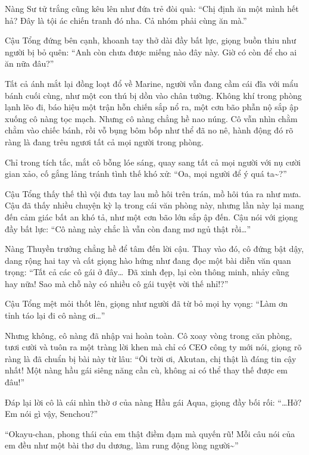 \documentclass[../main.tex]{subfiles}
\begin{document}
Nàng Sư tử trắng cũng kêu lên như đứa trẻ đòi quà: ``Chị định ăn một mình hết hả? Đây là tội ác chiến tranh đó nha. Cả nhóm phải cùng ăn mà.''

Cậu Tổng đứng bên cạnh, khoanh tay thở dài đầy bất lực, giọng buồn thiu như người bị bỏ quên: ``Anh còn chưa được miếng nào đây này. Giờ có còn để cho ai ăn nữa đâu?''

Tất cả ánh mắt lại đồng loạt đổ về Marine, người vẫn đang cầm cái đĩa với mẩu bánh cuối cùng, như một con thú bị dồn vào chân tường. Không khí trong phòng lạnh lẽo đi, báo hiệu một trận hỗn chiến sắp nổ ra, một cơn bão phẫn nộ sắp ập xuống cô nàng tọc mạch. Nhưng cô nàng chẳng hề nao núng. Cô vẫn nhìn chằm chằm vào chiếc bánh, rồi vỗ bụng bôm bốp như thể đã no nê, hành động đó rõ ràng là đang trêu ngươi tất cả mọi người trong phòng.

Chỉ trong tích tắc, mắt cô bỗng lóe sáng, quay sang tất cả mọi người với nụ cười gian xảo, cố gắng lảng tránh tình thế khó xử: ``Oa, mọi người để ý quá ta\~{}?''

Cậu Tổng thấy thế thì vội đưa tay lau mồ hôi trên trán, mồ hôi túa ra như mưa. Cậu đã thấy nhiều chuyện kỳ lạ trong cái văn phòng này, nhưng lần này lại mang đến cảm giác bất an khó tả, như một cơn bão lớn sắp ập đến. Cậu nói với giọng đầy bất lực: ``Cô nàng này chắc là vẫn còn đang mơ ngủ thật rồi\dots''

Nàng Thuyền trưởng chẳng hề để tâm đến lời cậu. Thay vào đó, cô đứng bật dậy, dang rộng hai tay và cất giọng hào hứng như đang đọc một bài diễn văn quan trọng: ``Tất cả các cô gái ở đây\dots\ Đã xinh đẹp, lại còn thông minh, nhảy cũng hay nữa! Sao mà chỗ này có nhiều cô gái tuyệt vời thế nhỉ!?''

Cậu Tổng mệt mỏi thốt lên, giọng như người đã từ bỏ mọi hy vọng: ``Làm ơn tỉnh táo lại đi cô nàng ơi\dots''

Nhưng không, cô nàng đã nhập vai hoàn toàn. Cô xoay vòng trong căn phòng, tươi cười và tuôn ra một tràng lời khen mà chỉ có CEO công ty mới nói, giọng rõ ràng là đã chuẩn bị bài này từ lâu: ``Ôi trời ơi, Akutan, chị thật là đáng tin cậy nhất! Một nàng hầu gái siêng năng cần cù, không ai có thể thay thế được em đâu!''


Đáp lại lời cô là cái nhìn thờ ơ của nàng Hầu gái Aqua, giọng đầy bối rối: ``\dots Hở? Em nói gì vậy, Senchou?''

``Okayu-chan, phong thái của em thật điềm đạm mà quyến rũ! Mỗi câu nói của em đều như một bài thơ du dương, làm rung động lòng người\~{}''
\end{document}
